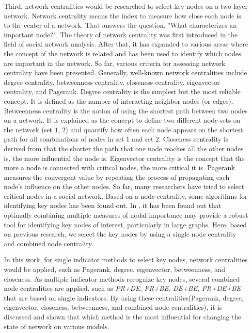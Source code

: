 Third, network centralities would be researched to select key nodes on a two-layer network. Network centrality means the index to measure how close each node is to the center of a network. That answers the question, "What characterizes an important node?". The theory of network centrality was first introduced in the field of social network analysis.\parencite{freeman1979} After that, it has expanded to various areas where the concept of the network is related and has been used to identify which nodes are important in the network. So far, various criteria for assessing network centrality have been presented. Generally, well-known network centralities include degree centrality, betweenness centrality, closeness centrality, eigenvector centrality, and Pagerank.\parencite{koschutzki2008, francisco2019, bianconi2018} Degree centrality is the simplest but the most reliable concept. It is defined as the number of interacting neighbor nodes (or edges).  Betweenness centrality is the notion of using the shortest path between two nodes on a network. It is explained as the concept to define two different node sets on the network (set $1$, $2$) and quantify how often each node appears on the shortest path for all combinations of nodes in set $1$ and set $2$. Closeness centrality is derived from that the shorter the path that one node reaches all the other nodes is, the more influential the node is. Eigenvector centrality is the concept that the more a node is connected with critical nodes, the more critical it is. Pagerank measures the convergent value by repeating the process of propagating each node's influence on the other nodes.
So far, many researchers have tried to select critical nodes in a social network.\parencite{eom2015, white2003, mesgari2015, hwang1981, huang2014} Based on a node centrality, some algorithms for identifying key nodes has been found out. In \parencite{mesgari2015, huang2014}, it has been found out that optimally combining multiple measures of nodal importance may provide a robust tool for identifying key nodes of interest, particularly in large graphs. Here, based on previous research, we select the key nodes by using a single node centrality and combined node centrality.

In this work, for single indicator methods to select key nodes, network centralities would be applied, such as Pagerank, degree, eigenvector, betweenness, and closeness. As multiple indicator methods recognize key nodes, several combined node centralities are applied, such as \textit{PR+DE, PR+BE, DE+BE, PR+DE+BE} that are based on single indicators.  By using these centralities(Pagerank, degree, eigenvector, closeness, betweenness, and combined node centralities), it is discussed and shown that which method is the most influential for changing the state of network on various models.\\  

